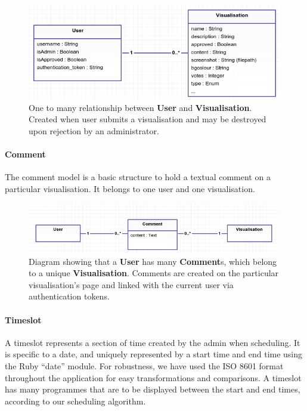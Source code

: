 \documentclass[a4paper, titlepage]{article}
\begin{document}
\begin{figure}[h!]
  \centering
    \includegraphics[width = 0.99\textwidth]{./relations/user-vis.png}
  \caption{One to many relationship between \textbf{User} and \textbf{Visualisation}. Created when 
  			user submits a visualisation and may be destroyed upon rejection by an administrator.}
  \label{fig:rel-user-vis}
\end{figure}




\paragraph{Comment}
The comment model is a basic structure to hold a textual comment on a particular visualisation. It 
belongs to one user and one visualisation. 

\begin{figure}[h!]
  \centering
    \includegraphics[width = 0.99\textwidth]{./relations/user-comment-vis.png}
  \caption{Diagram showing that a \textbf{User} has many \textbf{Comment}s, which belong to a unique
  			\textbf{Visualisation}. Comments are created on the particular visualisation's page and
  			linked with the current user via authentication tokens.}
  \label{fig:rel-user-comment-vis}
\end{figure}




\paragraph{Timeslot}
A timeslot represents a section of time created by the admin when scheduling. It is specific to a date,
and uniquely represented by a start time and end time using the Ruby ``date'' module. For robustness,
we have used the ISO 8601 format throughout the application for easy transformations and comparisons. A 
timeslot has many programmes that are to be displayed between the start and end times, according to our 
scheduling algorithm.
\end{document}
